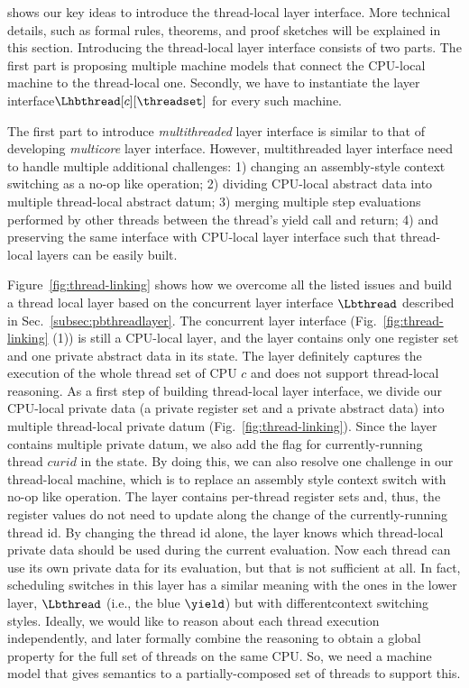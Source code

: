  shows our key ideas to introduce the thread-local layer interface.
More technical details, such as formal rules, theorems, and proof sketches will be explained in this section.
Introducing the  thread-local layer interface consists of two parts.
The first part is proposing multiple machine models that connect the CPU-local machine to the thread-local one.
Secondly, we have to instantiate the layer  interface$\Lhbthread[c][\threadset]$  for every such machine.

The first part to introduce \emph{multithreaded} layer interface
is similar to that of developing \emph{multicore} layer interface.
However, multithreaded layer interface need to handle
multiple additional challenges:
1) changing an assembly-style context switching as a no-op like operation;
2) dividing CPU-local abstract data into multiple thread-local abstract datum; 
3) merging multiple step evaluations performed by other threads between the thread's yield call and return; 
4) and preserving the same interface with CPU-local layer interface such that thread-local layers can be easily built.


Figure~\ref{fig:thread-linking} shows how we overcome all the listed issues and build a thread local layer based on the 
 concurrent layer interface $\Lbthread$ described in Sec.~\ref{subsec:pbthreadlayer}.
The concurrent layer interface (\cf Fig.~\ref{fig:thread-linking} (1)) is still a CPU-local layer,
and the layer contains only one register set and one private abstract data in its state.
The layer definitely captures the execution of the whole thread set of CPU $c$ 
and does not support thread-local reasoning.
As a first step of building thread-local layer interface, 
we divide our CPU-local private data (a private register set and a private abstract data) into multiple thread-local
private datum (Fig.~\ref{fig:thread-linking}). 
Since the layer contains multiple private datum, we also add the flag for currently-running thread $curid$ in the state. 
By doing this, we can also resolve one challenge in our thread-local machine, which is to replace an assembly style 
context switch with no-op like operation. 
The layer contains per-thread register sets and, thus, the register values do not need to update along the change of the currently-running thread id. By changing the thread id alone, the layer knows which thread-local private data should be 
used during the current evaluation.
Now each thread can use its own private data for its evaluation, but that is not sufficient at all. 
In fact, scheduling switches in this layer has a similar meaning with the ones in the lower layer, 
$\Lbthread$ (i.e., the blue $\yield$) but with differentcontext switching styles.
Ideally, we would like to reason about each thread execution 
independently, and later formally combine the reasoning to obtain a global
property for the full set of threads on the same CPU.
So, we need a machine model that gives semantics to
a partially-composed set of threads to support this.

